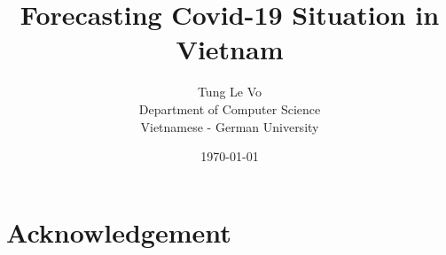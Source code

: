 \documentclass[a4paper,12pt]{report}
\title{Forecasting Covid-19 Situation in Vietnam}
\author{
    Tung Le Vo\\
    Department of Computer Science\\
    Vietnamese - German University
}
\date{\today}
\begin{document}
\maketitle
\newpage


\section*{Acknowledgement}
\end{document}
